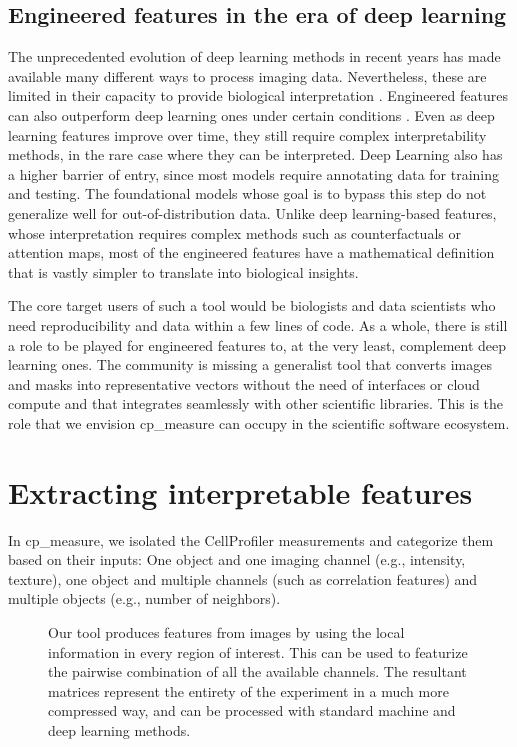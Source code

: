 \documentclass{article}
\begin{document}
\subsection{Engineered features in the era of deep learning}
\label{sec:org9dc3dfa}
The unprecedented evolution of deep learning methods in recent years has made available many different ways to process imaging data. Nevertheless, these are limited in their capacity to provide biological interpretation \citep{moenDeepLearningCellular2019}. Engineered features can also outperform deep learning ones under certain conditions \citep{tangMorphologicalProfilingDrug2024}. Even as deep learning features improve over time, they still require complex interpretability methods, in the rare case where they can be interpreted. Deep Learning also has a higher barrier of entry, since most models require annotating data for training and testing. The foundational models whose goal is to bypass this step do not generalize well for out-of-distribution data. Unlike deep learning-based features, whose interpretation requires complex methods such as counterfactuals or attention maps, most of the engineered features have a mathematical definition that is vastly simpler to translate into biological insights.

The core target users of such a tool would be biologists and data scientists who need reproducibility and data within a few lines of code. As a whole, there is still a role to be played for engineered features to, at the very least, complement deep learning ones. The community is missing a generalist tool that converts images and masks into representative vectors without the need of interfaces or cloud compute and that integrates seamlessly with other scientific libraries. This is the role that we envision cp\_measure can occupy in the scientific software ecosystem.
\section{Extracting interpretable features}
\label{sec:org61842b5}
In cp\_measure, we isolated the CellProfiler measurements and categorize them based on their inputs: One object and one imaging channel (e.g., intensity, texture), one object and multiple channels (such as correlation features) and multiple objects (e.g., number of neighbors).

\begin{figure}[htbp]
\centering

\caption{\label{fig:overview}Our tool produces features from images by using the local information in every region of interest. This can be used to featurize the pairwise combination of all the available channels. The resultant matrices represent the entirety of the experiment in a much more compressed way, and can be processed with standard machine and deep learning methods.}
\end{figure}
\end{document}
